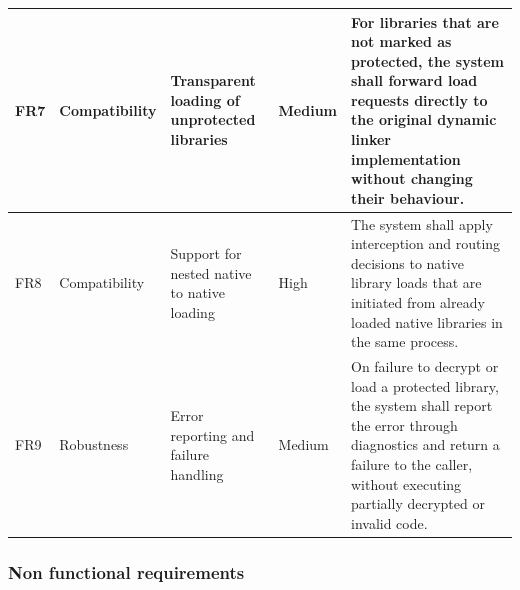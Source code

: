 \documentclass[11pt,a4paper]{report}
\renewcommand\_{{\textunderscore\allowbreak}}
\begin{document}
{\begin{longtable}{|p{}|p{}|p{}|p{}|p{}|}
        \hline
        FR7 & Compatibility &
        Transparent loading of unprotected libraries & Medium &
        For libraries that are not marked as protected, the system shall forward load requests directly to the original dynamic linker implementation without changing their behaviour. \\
        \hline
        FR8 & Compatibility &
        Support for nested native to native loading & High &
        The system shall apply interception and routing decisions to native library loads that are initiated from already loaded native libraries in the same process. \\
        \hline
        FR9 & Robustness &
        Error reporting and failure handling & Medium &
        On failure to decrypt or load a protected library, the system shall report the error through diagnostics and return a failure to the caller, without executing partially decrypted or invalid code. \\
        \hline
\end{longtable}
}%

\subsubsection{Non functional requirements}
\end{document}
